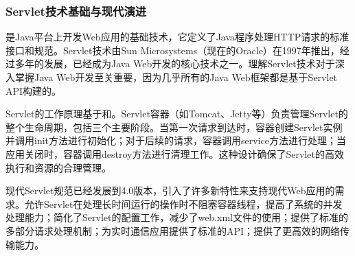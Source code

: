 \hypertarget{servletux6280ux672fux57faux7840ux4e0eux73b0ux4ee3ux6f14ux8fdb}{%
\subsubsection{Servlet技术基础与现代演进}\label{servletux6280ux672fux57faux7840ux4e0eux73b0ux4ee3ux6f14ux8fdb}}

是Java平台上开发Web应用的基础技术，它定义了Java程序处理HTTP请求的标准接口和规范。Servlet技术由Sun Microsystems（现在的Oracle）在1997年推出，经过多年的发展，已经成为Java Web开发的核心技术之一。理解Servlet技术对于深入掌握Java Web开发至关重要，因为几乎所有的Java Web框架都是基于Servlet API构建的。

Servlet的工作原理基于和。Servlet容器（如Tomcat、Jetty等）负责管理Servlet的整个生命周期，包括三个主要阶段。当第一次请求到达时，容器创建Servlet实例并调用init方法进行初始化；对于后续的请求，容器调用service方法进行处理；当应用关闭时，容器调用destroy方法进行清理工作。这种设计确保了Servlet的高效执行和资源的合理管理。

现代Servlet规范已经发展到4.0版本，引入了许多新特性来支持现代Web应用的需求。允许Servlet在处理长时间运行的操作时不阻塞容器线程，提高了系统的并发处理能力；简化了Servlet的配置工作，减少了web.xml文件的使用；提供了标准的多部分请求处理机制；为实时通信应用提供了标准的API；提供了更高效的网络传输能力。

